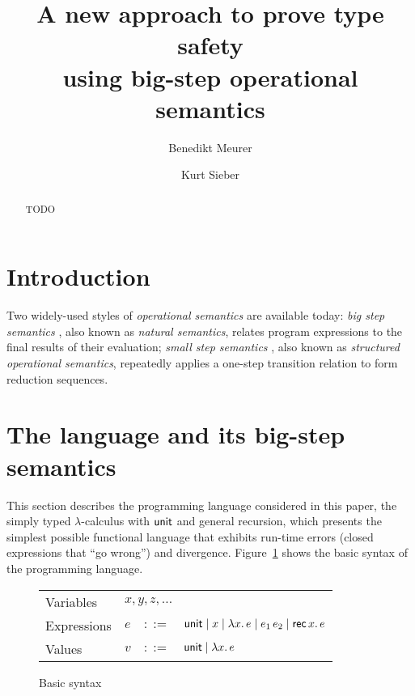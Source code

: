 \documentclass[12pt,a2paper,draft]{article}
\newcommand{\abstr}[2]{\ensuremath{\lambda{#1}.\,{#2}}}
\newcommand{\app}[2]{\ensuremath{{#1}\,{#2}}}
\newcommand{\rec}[2]{\ensuremath{{\normalfont\textsf{rec}}\,{#1}.\,{#2}}}
\newcommand{\unit}{\ensuremath{\normalfont\textsf{unit}}}
\begin{document}
\title{%
  A new approach to prove type safety\\using big-step operational semantics
}
\author{Benedikt Meurer}
\author{Kurt Sieber}
\date{}
\maketitle
\begin{abstract}
  TODO
\end{abstract}


\section{Introduction}

Two widely-used styles of \emph{operational semantics} are available today: \emph{big step semantics} \cite{Kahn87},
also known as \emph{natural semantics}, relates program expressions to the final results of their
evaluation; \emph{small step semantics} \cite{Plotkin81,Plotkin04}, also known as
\emph{structured operational semantics}, repeatedly applies a one-step transition relation to
form reduction sequences.


\section{The language and its big-step semantics}

This section describes the programming language considered in this paper,
the simply typed $\lambda$-calculus with $\unit$ and general recursion, which
presents the simplest possible functional language that exhibits run-time
errors (closed expressions that ``go wrong'') and divergence. Figure~\ref{fig:Basic_syntax}
shows the basic syntax of the programming language.

\begin{figure}[htb]
  \centering
  \begin{tabular}{llcl}
    Variables   & \multicolumn{3}{l}{$x,y,z,\ldots$} \\
    Expressions & $e$ & $::=$ & $\unit \mid x \mid \abstr{x}{e} \mid \app{e_1}{e_2} \mid \rec{x}{e}$ \\
    Values      & $v$ & $::=$ & $\unit \mid \abstr{x}{e}$
  \end{tabular}
  \caption{Basic syntax}
  \label{fig:Basic_syntax}
\end{figure}
\end{document}
